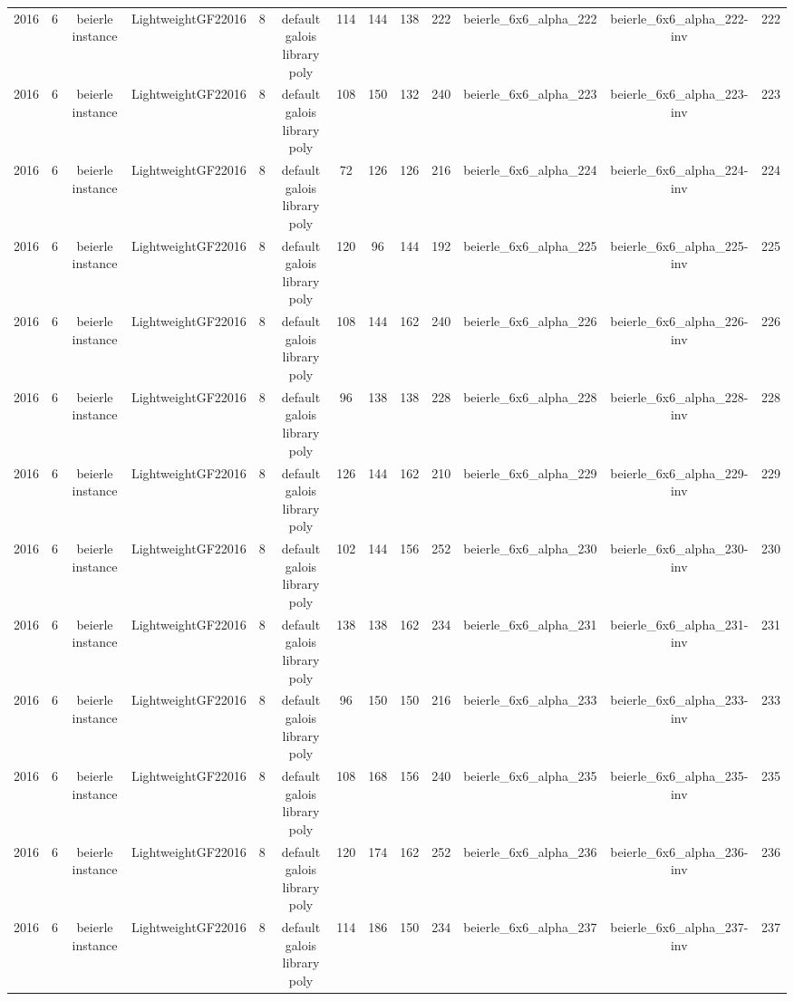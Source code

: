 \begin{tabular}{c c c c c c c c c c c c c}
2016 & 6 & beierle instance & LightweightGF22016 & 8 & default galois library poly & 114 & 144 & 138 & 222 & beierle_6x6_alpha_222 & beierle_6x6_alpha_222-inv & 222 \\
2016 & 6 & beierle instance & LightweightGF22016 & 8 & default galois library poly & 108 & 150 & 132 & 240 & beierle_6x6_alpha_223 & beierle_6x6_alpha_223-inv & 223 \\
2016 & 6 & beierle instance & LightweightGF22016 & 8 & default galois library poly & 72 & 126 & 126 & 216 & beierle_6x6_alpha_224 & beierle_6x6_alpha_224-inv & 224 \\
2016 & 6 & beierle instance & LightweightGF22016 & 8 & default galois library poly & 120 & 96 & 144 & 192 & beierle_6x6_alpha_225 & beierle_6x6_alpha_225-inv & 225 \\
2016 & 6 & beierle instance & LightweightGF22016 & 8 & default galois library poly & 108 & 144 & 162 & 240 & beierle_6x6_alpha_226 & beierle_6x6_alpha_226-inv & 226 \\
2016 & 6 & beierle instance & LightweightGF22016 & 8 & default galois library poly & 96 & 138 & 138 & 228 & beierle_6x6_alpha_228 & beierle_6x6_alpha_228-inv & 228 \\
2016 & 6 & beierle instance & LightweightGF22016 & 8 & default galois library poly & 126 & 144 & 162 & 210 & beierle_6x6_alpha_229 & beierle_6x6_alpha_229-inv & 229 \\
2016 & 6 & beierle instance & LightweightGF22016 & 8 & default galois library poly & 102 & 144 & 156 & 252 & beierle_6x6_alpha_230 & beierle_6x6_alpha_230-inv & 230 \\
2016 & 6 & beierle instance & LightweightGF22016 & 8 & default galois library poly & 138 & 138 & 162 & 234 & beierle_6x6_alpha_231 & beierle_6x6_alpha_231-inv & 231 \\
2016 & 6 & beierle instance & LightweightGF22016 & 8 & default galois library poly & 96 & 150 & 150 & 216 & beierle_6x6_alpha_233 & beierle_6x6_alpha_233-inv & 233 \\
2016 & 6 & beierle instance & LightweightGF22016 & 8 & default galois library poly & 108 & 168 & 156 & 240 & beierle_6x6_alpha_235 & beierle_6x6_alpha_235-inv & 235 \\
2016 & 6 & beierle instance & LightweightGF22016 & 8 & default galois library poly & 120 & 174 & 162 & 252 & beierle_6x6_alpha_236 & beierle_6x6_alpha_236-inv & 236 \\
2016 & 6 & beierle instance & LightweightGF22016 & 8 & default galois library poly & 114 & 186 & 150 & 234 & beierle_6x6_alpha_237 & beierle_6x6_alpha_237-inv & 237 \\

\end{tabular}
